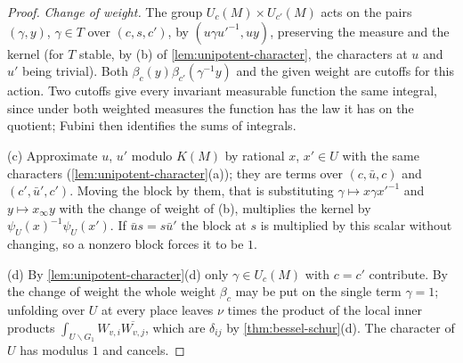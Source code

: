 \begin{proof}
\emph{Change of weight.} The group $U_c(M)\times U_{c'}(M)$ acts on the pairs $(\gamma,y)$, $\gamma\in T$ over $(c,s,c')$, by $(u\gamma u'^{-1},uy)$, preserving the measure and the kernel (for $T$ stable, by (b) of \cref{lem:unipotent-character}, the characters at $u$ and $u'$ being
trivial). Both $\beta_c(y)\beta_{c'}(\gamma^{-1}y)$ and the given weight are cutoffs for this action. Two cutoffs give every invariant measurable function the same integral, since under both weighted measures the function has the law it has on the
quotient; Fubini then identifies the sums of integrals.

(c) Approximate $u$, $u'$ modulo $K(M)$ by rational $x$, $x'\in U$ with the same characters (\cref{lem:unipotent-character}(a)); they are terms over $(c,\bar u,c)$ and $(c',\bar u',c')$. Moving the block by them, that is substituting $\gamma\mapsto x\gamma x'^{-1}$ and $y\mapsto x_\infty y$ with the change of weight
of (b), multiplies the kernel by $\psi_U(x)^{-1}\psi_U(x')$. If $\bar us=s\bar u'$ the block at $s$ is multiplied by this scalar without changing, so a nonzero block forces it to be $1$.

(d) By \cref{lem:unipotent-character}(d) only $\gamma\in U_c(M)$ with $c=c'$ contribute. By the change of weight the whole weight $\beta_c$ may be put on the single term $\gamma=1$; unfolding over $U$ at every place leaves $\nu$ times the product of the local inner products
$\int_{U\backslash G_1}W_{v,i}\overline{W_{v,j}}$, which are $\delta_{ij}$ by \cref{thm:bessel-schur}(d). The character of $U$ has modulus $1$ and cancels.
\end{proof}

